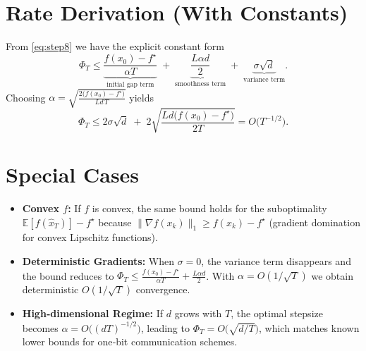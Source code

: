 \documentclass[11pt]{article}
\newcommand{\E}{\mathbb{E}}
\begin{document}
\section*{Rate Derivation (With Constants)}
From \eqref{eq:step8} we have the explicit constant form
\[
\Phi_T\le
\underbrace{\frac{f(x_0)-f^\star}{\alpha T}}_{\text{initial gap term}}
\;+\;
\underbrace{\frac{L\alpha d}{2}}_{\text{smoothness term}}
\;+\;
\underbrace{\sigma\sqrt{d}}_{\text{variance term}} .
\]
Choosing $\alpha = \sqrt{\frac{2\bigl(f(x_0)-f^\star\bigr)}{L d\,T}}$ yields
\[
\Phi_T\le
2\sigma\sqrt{d}\;+\;2\sqrt{\frac{L d\bigl(f(x_0)-f^\star\bigr)}{2T}}
= O\!\bigl(T^{-1/2}\bigr) .
\]

\section*{Special Cases}
\begin{itemize}
    \item \textbf{Convex $f$:} If $f$ is convex, the same bound holds for the suboptimality $ \E[f(\hat{x}_T)]-f^\star$ because $\|\nabla f(x_k)\|_{1}\ge f(x_k)-f^\star$ (gradient domination for convex Lipschitz functions).
    \item \textbf{Deterministic Gradients:} When $\sigma=0$, the variance term disappears and the bound reduces to $\Phi_T\le\frac{f(x_0)-f^\star}{\alpha T}+\frac{L\alpha d}{2}$. With $\alpha=O(1/\sqrt{T})$ we obtain deterministic $O(1/\sqrt{T})$ convergence.
    \item \textbf{High‑dimensional Regime:} If $d$ grows with $T$, the optimal stepsize becomes $\alpha=O\bigl((dT)^{-1/2}\bigr)$, leading to $\Phi_T=O\bigl(\sqrt{d/T}\bigr)$, which matches known lower bounds for one‑bit communication schemes.
\end{itemize}
\end{document}
